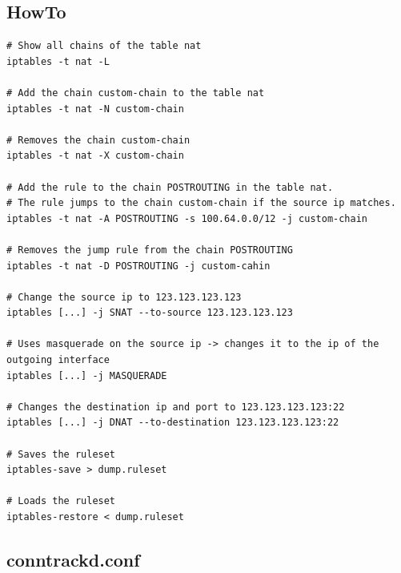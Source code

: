 \documentclass{report}
\begin{document}
\subsection{HowTo}

\begingroup
\fontsize{9pt}{9pt}\selectfont
\begin{verbatim}
# Show all chains of the table nat
iptables -t nat -L

# Add the chain custom-chain to the table nat
iptables -t nat -N custom-chain

# Removes the chain custom-chain
iptables -t nat -X custom-chain

# Add the rule to the chain POSTROUTING in the table nat.
# The rule jumps to the chain custom-chain if the source ip matches.
iptables -t nat -A POSTROUTING -s 100.64.0.0/12 -j custom-chain

# Removes the jump rule from the chain POSTROUTING
iptables -t nat -D POSTROUTING -j custom-cahin

# Change the source ip to 123.123.123.123
iptables [...] -j SNAT --to-source 123.123.123.123

# Uses masquerade on the source ip -> changes it to the ip of the outgoing interface
iptables [...] -j MASQUERADE

# Changes the destination ip and port to 123.123.123.123:22
iptables [...] -j DNAT --to-destination 123.123.123.123:22

# Saves the ruleset
iptables-save > dump.ruleset

# Loads the ruleset
iptables-restore < dump.ruleset
\end{verbatim}
\endgroup

\subsection{conntrackd.conf}\label{conntrackd.conf}
\end{document}
